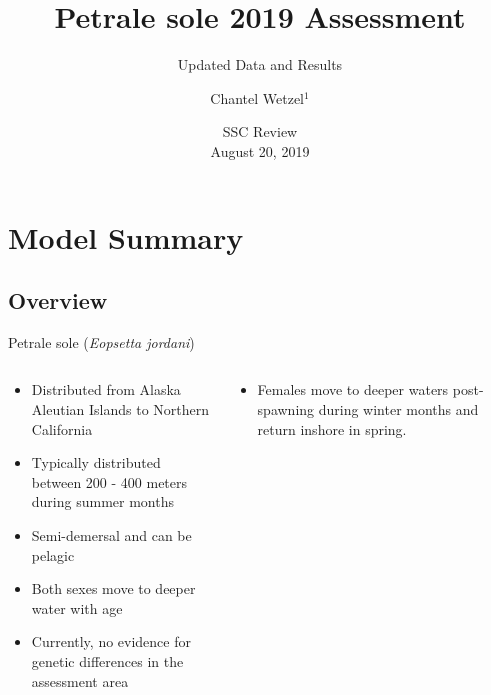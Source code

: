 \documentclass[pdf]{beamer}\usepackage[]{graphicx}\usepackage[]{color}
\title{Petrale sole 2019 Assessment}
\subtitle{Updated Data and Results}
\author{Chantel Wetzel$^{1}$}
\institute[NWFSC]{
Northwest Fisheries Science Center$^1$ \\
\medskip
}
\date{{\footnotesize SSC Review \\ August 20, 2019}}
\begin{document}
\begin{frame}
  \titlepage
\end{frame}


\section{Model Summary}
\subsection{Overview}
\begin{frame}{Petrale sole (\textit{Eopsetta jordani})}
\begin{columns}
  \begin{column}{0.5\textwidth}
      \begin{itemize}
        \item Distributed from  Alaska Aleutian Islands to Northern California
        \item Typically distributed between 200 - 400 meters during summer months
        \item Semi-demersal and can be pelagic
        \item Both sexes move to deeper water with age
        \item Currently, no evidence for genetic differences in the assessment area
      \end{itemize}
  \end{column}
  
  \begin{column}{0.5\textwidth}
    \begin{itemize}
        \item Females move to deeper waters post-spawning during winter months and return inshore in spring.
      \end{itemize}
  \end{column}
\end{columns}
\end{frame}
\end{document}
